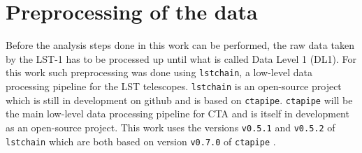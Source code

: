 \chapter{Preprocessing of the data}
\label{ch:prepro}

Before the analysis steps done in this work can be performed, the raw data taken by the LST-1 has to be processed up until what is called Data Level 1 (DL1).
For this work such preprocessing was done using \texttt{lstchain}, a low-level data processing pipeline for the LST telescopes. 
\texttt{lstchain} is an open-source project which is still in development on github \cite{lstchain} and is based on \texttt{ctapipe}. 
\texttt{ctapipe} will be the main low-level data processing pipeline for CTA and is itself in development as an open-source project.
This work uses the versions \texttt{v0.5.1} and \texttt{v0.5.2} of \texttt{lstchain} which are both based on version \texttt{v0.7.0} of \texttt{ctapipe} \cite{ctapipe}. 

